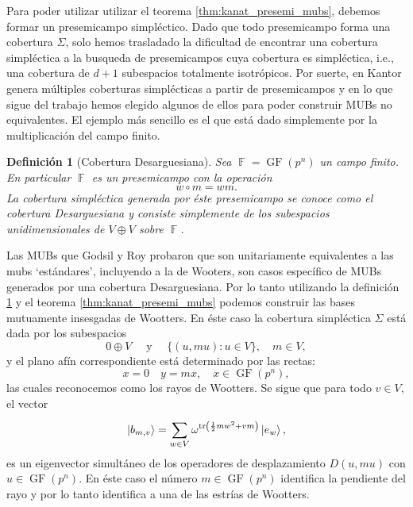 \documentclass[a4paper]{report}
\DeclareMathOperator{\F}{\mathbb{F}}
\DeclareMathOperator{\tr}{tr}
\DeclareMathOperator{\GF}{GF}
\newtheorem{definition}{Definición}
\begin{document}
  Para poder utilizar utilizar el teorema
  \ref{thm:kanat_presemi_mubs}, debemos formar un
  presemicampo simpléctico. Dado que todo presemicampo forma
  una cobertura $\Sigma$, solo hemos trasladado la
  dificultad de encontrar una cobertura simpléctica a la
  busqueda de presemicampos cuya cobertura es simpléctica,
  i.e., una cobertura de $d+1$ subespacios totalmente
  isotrópicos. Por suerte, en \cite{kantor1982} Kantor
  genera múltiples coberturas simplécticas a partir de
  presemicampos y en lo que sigue del trabajo hemos elegido
  algunos de ellos para poder construir MUBs no
  equivalentes. El ejemplo más sencillo es el que está dado
  simplemente por la multiplicación del campo finito.
  \begin{definition}[Cobertura Desarguesiana]
    \label{def:desarguesian_semifield}
    Sea $\F = \GF(p^{n})$ un campo finito. En particular
    $\F$ es un presemicampo con la operación
    \begin{equation}
      w \circ m = w m.
    \end{equation}
    La cobertura simpléctica generada por éste presemicampo
    se conoce como el cobertura Desarguesiana y consiste
    simplemente de los subespacios unidimensionales de $V
    \oplus V$ sobre $\F$.
  \end{definition}
  Las MUBs que Godsil y Roy probaron que son unitariamente
  equivalentes a las mubs `estándares', incluyendo a la de
  Wooters, son casos específico de MUBs generados por una
  cobertura Desarguesiana. Por lo tanto utilizando la
  definición \ref{def:desarguesian_semifield} y el teorema
  \ref{thm:kanat_presemi_mubs} podemos construir las bases
  mutuamente insesgadas de Wootters. En éste caso la
  cobertura simpléctica $\Sigma$ está dada por los
  subespacios
  \begin{equation}
    0 \oplus V
    \quad \text{ y } \quad
    \{(u,mu) : u \in V\},
    \quad m \in V,
  \end{equation}
  y el plano afín correspondiente está determinado por las
  rectas:
  \begin{equation}
    x = 0
    \quad
    y = mx,
    \quad
    x \in \GF(p^{n}),
  \end{equation}
  las cuales reconocemos como los rayos de Wootters. Se
  sigue que para todo $v \in V$, el vector
  \begin{equation}
    \label{eqn:desargues_vectors}
    \ket{b_{m,v}}
    = \sum_{w \in V}^{} \omega^{\tr\left( \frac{1}{2} m w^2
    + v m\right) } \ket{e_w},
  \end{equation} 
  es un eigenvector simultáneo de los operadores de
  desplazamiento $D(u,mu)$ con $u \in \GF(p^{n})$. En éste
  caso el número $m \in \GF(p^{n})$ identifica la pendiente
  del rayo y por lo tanto identifica a una de las estrías de
  Wootters.
\end{document}
